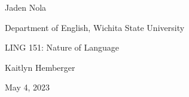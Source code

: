 \begin{titlepage}
  \begin{center}
    {\doublespacing
      \vspace*{4\baselineskip}

      \textbf{\mytitle}
      \vspace*{\baselineskip}

      Jaden Nola

      Department of English, Wichita State University

      LING 151: Nature of Language

      Kaitlyn Hemberger

      May 4, 2023\par
    }
  \end{center}
\end{titlepage}
